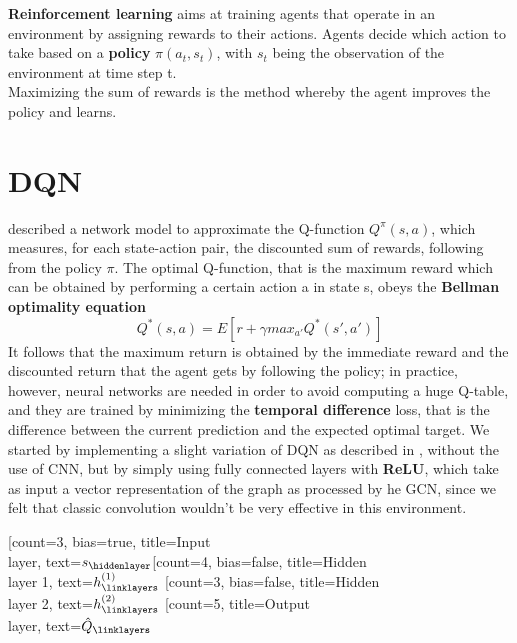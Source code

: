 \textbf{Reinforcement learning} aims at training agents that operate in an environment by assigning rewards to their actions. Agents decide which action to take based on a \textbf{policy} $\pi(a_t, s_t)$, with $s_t$ being the observation of the environment at time step t. \\
Maximizing the sum of rewards is the method whereby the agent improves the policy and learns.

\section{DQN}
\cite{dqn} described a network model to approximate the Q-function $Q^{\pi}(s,a)$, which measures, for each state-action pair, the discounted sum of rewards, following from the policy $\pi$. The optimal Q-function, that is the maximum reward which can be obtained by performing a certain action a in state s, obeys the \textbf{Bellman optimality equation} $$Q^*(s,a) = E[r + \gamma max_{a'}Q^*(s', a')]$$
It follows that the maximum return is obtained by the immediate reward and the discounted return that the agent gets by following the policy; in practice, however, neural networks are needed in order to avoid computing a huge Q-table, and they are trained by minimizing the \textbf{temporal difference} loss, that is the difference between the current prediction and the expected optimal target.  
We started by implementing a slight variation of DQN as described in \cite{dqn}, without the use of CNN, but by simply using fully connected layers with \textbf{ReLU}, which take as input a vector representation of the graph as processed by he GCN, since we felt that classic convolution wouldn't be very effective in this environment. \\
\begin{center}
\begin{neuralnetwork} [nodespacing=10mm, layerspacing=25mm,
			maintitleheight=2.5em, layertitleheight=2.5em,
			height=5, toprow=false, nodesize=17pt, style={},
			title={}, titlestyle={}]
		        \newcommand{\x}[2]{$s_#2$}
		        \newcommand{\y}[2]{$\hat{Q}_#2$}
		        \newcommand{\hfirst}[2]{\small $h^{(1)}_#2$}
		        \newcommand{\hsecond}[2]{\small $h^{(2)}_#2$}
		        [count=3, bias=true, title=Input\\layer, text=\x]
		        \hiddenlayer[count=4, bias=false, title=Hidden\\layer 1, text=\hfirst] \linklayers
		        \hiddenlayer[count=3, bias=false, title=Hidden\\layer 2, text=\hsecond] \linklayers
		        \outputlayer[count=5, title=Output\\layer, text=\y] \linklayers
\end{neuralnetwork}
\end{center}
	
